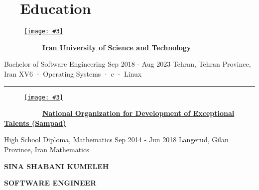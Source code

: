 \documentclass[a4paper,20pt]{article}
\newcommand{\companyHeadingWithImageSimple}[3]{
    \vspace{-24pt}
    \begin{figure}[H]
        \href{#2}{\texttt{[image: \#3]}}
        \vspace{-37.5pt}
    \end{figure}
    ~~~~~~~~~~~\textbf{\href{#2}{#1}}
    \vspace{6pt}
}
\newcommand{\companyHeadingEnd}{
    \vspace{-22pt}
    \begin{center}
        \color{myGray}\par\noindent\rule{.92\textwidth}{0.1pt}
    \end{center}
}
\newcommand{\resumeSubHeadingListStart}{\begin{itemize}[leftmargin=*, label={}]}
\newcounter{mylist} %
\newenvironment{myitemize}{%
  \stepcounter{mylist}%
  \begin{itemize}
}{\end{itemize}%
  }
\begin{document}
\section{~~Education}
    \vspace{16pt}
    \companyHeadingWithImageSimple{Iran University of Science and Technology}{https://www.linkedin.com/company/balemessenger}{iust}
    \vspace{2pt}
    \begin{myitemize}
        \begin{newexperience}                
            {Bachelor of Software Engineering}
            {Sep 2018 - Aug 2023}
            {Tehran, Tehran Province, Iran}
            {XV6 · Operating Systems · c · Linux}
        \end{newexperience}
    \end{myitemize}
    \companyHeadingEnd
    \companyHeadingWithImageSimple{National Organization for Development of Exceptional Talents (Sampad)}{https://www.linkedin.com/school/iransampad/}{sampad}
    \vspace{2pt}
    \begin{myitemize}
        \begin{newexperience}                
            {High School Diploma, Mathematics}
            {Sep 2014 - Jun 2018}
            {Langerud, Gilan Province, Iran}
            {Mathematics}
        \end{newexperience}
    \end{myitemize}
    \noindent

\begin{center}
  \huge\bfseries \MakeUppercase{Sina Shabani Kumeleh}
\end{center}
\begin{center}
  \Large\bfseries \MakeUppercase{Software Engineer}
\end{center}
\end{document}
